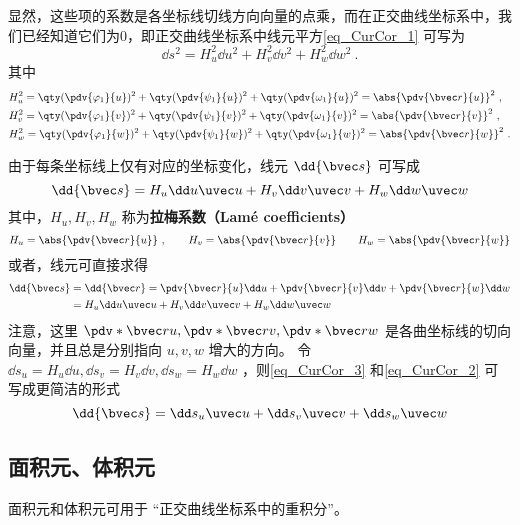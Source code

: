 显然，这些项的系数是各坐标线切线方向向量的点乘，而在正交曲线坐标系中，我们已经知道它们为0，即正交曲线坐标系中线元平方\autoref{eq_CurCor_1} 可写为
\begin{equation}
\dd s^2=H_u^2\dd u^2+H_v^2\dd v^2+H_w^2\dd w^2~.
\end{equation}
其中
\begin{equation}
\begin{aligned}
&H_u^2=\qty(\pdv{\varphi_1}{u})^2+\qty(\pdv{\psi_1}{u})^2+\qty(\pdv{\omega_1}{u})^2=\abs{\pdv{\bvec r}{u}}^2~,\\
&H_v^2=\qty(\pdv{\varphi_1}{v})^2+\qty(\pdv{\psi_1}{v})^2+\qty(\pdv{\omega_1}{v})^2=\abs{\pdv{\bvec r}{v}}^2~,\\
&H_w^2=\qty(\pdv{\varphi_1}{w})^2+\qty(\pdv{\psi_1}{w})^2+\qty(\pdv{\omega_1}{w})^2=\abs{\pdv{\bvec r}{w}}^2~.
\end{aligned}
\end{equation}

由于每条坐标线上仅有对应的坐标变化，线元 $\dd {\bvec s}$ 可写成
\begin{equation}\label{eq_CurCor_3}
\dd {\bvec s}=H_u\dd u\uvec u+H_v\dd v\uvec v+H_w\dd w\uvec w
\end{equation}
其中，$H_u,H_v,H_w$ 称为\textbf{拉梅系数（Lamé coefficients）}
\begin{equation}
H_u=\abs{\pdv{\bvec r}{u}}~,\qquad
H_v=\abs{\pdv{\bvec r}{v}}\qquad
H_w=\abs{\pdv{\bvec r}{w}}
\end{equation}
或者，线元可直接求得
\begin{equation}\label{eq_CurCor_2}
\begin{aligned}
\dd {\bvec s}&=\dd {\bvec r}=\pdv{\bvec r}{u}\dd u+\pdv{\bvec r}{v}\dd v+\pdv{\bvec r}{w}\dd w\\
&=H_u\dd u\uvec u+H_v\dd v\uvec v+H_w\dd w\uvec w
\end{aligned}
\end{equation}
注意，这里 $\pdv*{\bvec r}{u},\pdv*{\bvec r}{v},\pdv*{\bvec r}{w}$ 是各曲坐标线的切向向量，并且总是分别指向 $u,v,w$ 增大的方向。
令 $\dd s_u=H_u\dd u,\dd s_v=H_v\dd v,\dd s_w=H_w\dd w$ ，则\autoref{eq_CurCor_3} 和\autoref{eq_CurCor_2} 可写成更简洁的形式
\begin{equation}
\dd {\bvec s}=\dd s_u\uvec u+\dd s_v\uvec v+\dd s_w\uvec w
\end{equation}

\subsection{面积元、体积元}
面积元和体积元可用于 “正交曲线坐标系中的重积分”。

